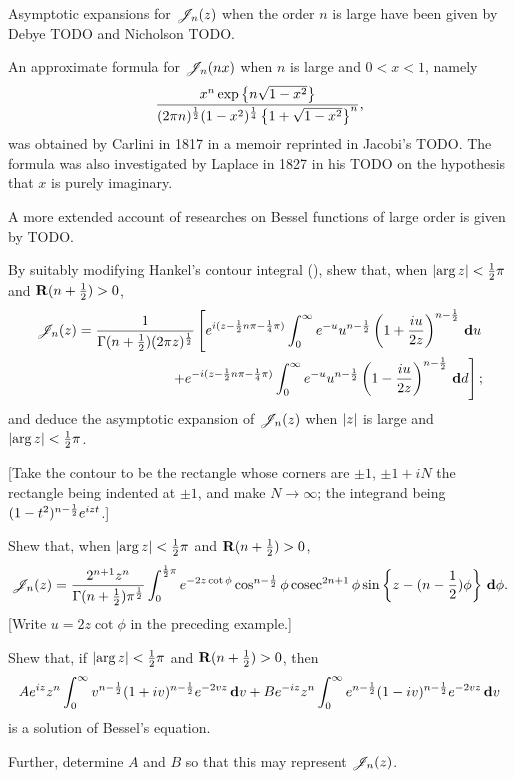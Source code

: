 Asymptotic expansions for $\mathscr{J}_{n}(z)$ when the order $n$ is large have
been given by Debye TODO and Nicholson TODO.

An approximate formula for $\mathscr{J}_{n}(nx)$ when $n$ is large and $0<x<1$,
namely
$$
\frac{ x^{n} \exp\left\{ n \sqrt{1-x^{2}} \right\}}{ (2\pi n)^{\frac{1}{2}} (1-x^{2})^{\frac{1}{4}} \left\{ 1 +
    \sqrt{1 - x^{2}} \right\}^{n}},
$$
was obtained by Carlini in 1817 in a memoir reprinted in Jacobi's
TODO.
The formula was also investigated by Laplace in 1827 in his TODO on
the hypothesis that $x$ is purely imaginary.

A more extended account of researches on Bessel functions of large
order is given by TODO.
\begin{wandwexample}
  By suitably modifying Hankel's contour integral
  (), shew that, when
  $\left| \arg z \right| < \frac{1}{2} \pi$ and
  $\operatorname{\mathbf{R}}(n+\frac{1}{2}) > 0$,
  \begin{align*}
    \mathscr{J}_{n}(z)
    =
    \frac{1}{\Gamma(n+\frac{1}{2}) (2\pi z)^{\frac{1}{2}}}
    \left[
      e^{i(z - \frac{1}{2} n \pi - \frac{1}{4} \pi)}
      \int_{0}^{\infty}
      e^{-u}
      u^{n-\frac{1}{2}}
      \left( 1 + \frac{iu}{2z} \right)^{n-\frac{1}{2}}
      \, \mathbf{d} u
    \right.
    \\
    \left.
      +
      e^{-i(z - \frac{1}{2} n \pi - \frac{1}{4}\pi)}
      \int_{0}^{\infty}
      e^{-u}
      u^{n-\frac{1}{2}}
      \left( 1 - \frac{iu}{2z} \right)^{n-\frac{1}{2}}
      \, \mathbf{d} d
    \right];
  \end{align*}
  and deduce the asymptotic expansion of $\mathscr{J}_{n}(z)$ when
  $\left| z \right|$ is large and
  $\left| \arg z \right| < \frac{1}{2} \pi$.

  [Take the contour to be the rectangle whose corners are
  $\pm 1$, $\pm 1 + iN$ the rectangle being indented at $\pm 1$,
  and make $N \rightarrow \infty$; the integrand being
  $(1-t^{2})^{n-\frac{1}{2}} e^{izt}$.]
\end{wandwexample}
\begin{wandwexample}
  Shew that, when $\left| \arg z \right| < \frac{1}{2} \pi$ and
  $\operatorname{\mathbf{R}}(n+\frac{1}{2}) > 0$,
  $$
  \mathscr{J}_{n}(z)
  =
  \frac{2^{n+1} z^{n}}{\Gamma(n+\frac{1}{2}) \pi^{\frac{1}{2}}}
  \int_{0}^{\frac{1}{2}\pi}
  e^{-2z\cot\phi}
  \cos^{n-\frac{1}{2}}\phi
  \operatorname{cosec}^{2n+1}\phi
  \sin\left\{ z - (n-\frac{1}{2})\phi \right\}
  \, \mathbf{d} \phi.
  $$
  [Write $u = 2z\cot\phi$ in the preceding example.]
\end{wandwexample}
\begin{wandwexample}
  Shew that, if $\left| \arg z \right| < \frac{1}{2} \pi$ and
  $\operatorname{\mathbf{R}}(n+\frac{1}{2}) > 0$, then
  $$
  A e^{iz} z^{n}
  \int_{0}^{\infty}
  v^{n-\frac{1}{2}}
  (1+iv)^{n-\frac{1}{2}}
  e^{-2vz}
  \, \mathbf{d} v
  +
  B e^{-iz} z^{n}
  \int_{0}^{\infty}
  e^{n-\frac{1}{2}}
  (1-iv)^{n-\frac{1}{2}}
  e^{-2vz}
  \, \mathbf{d} v
  $$
  is a solution of Bessel's equation.

  Further, determine $A$ and $B$ so that this may represent
  $\mathscr{J}_{n}(z)$.
\end{wandwexample}

